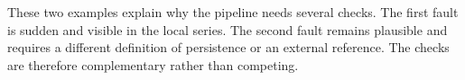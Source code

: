 These two examples explain why the pipeline needs several checks. The first
fault is sudden and visible in the local series. The second fault remains
plausible and requires a different definition of persistence or an external
reference. The checks are therefore complementary rather than competing.


